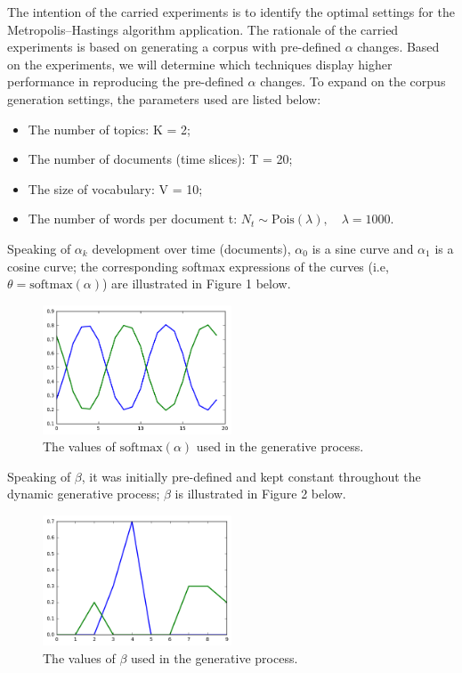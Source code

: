 \documentclass[12pt]{article}
\begin{document}
\par The intention of the carried experiments is to identify the optimal settings for the Metropolis--Hastings algorithm application. 
The rationale of the carried experiments is based on generating a corpus with pre-defined $\alpha$ changes. Based on the experiments, we will determine which techniques display higher performance in reproducing the pre-defined $\alpha$ changes. To expand on the corpus generation settings, the parameters used are listed below:
\begin{itemize}
  \item The number of topics: K = 2;
  \item The number of documents (time slices): T = 20;
  \item The size of vocabulary: V = 10;
  \item The number of words per document t: $N_t \sim \mbox{Pois}(\lambda),\quad \lambda = 1000$.
\end{itemize}
Speaking of $\alpha_k$ development over time (documents), $\alpha_0$ is a sine curve and $\alpha_1$ is a cosine curve; the corresponding softmax expressions of the curves (i.e, $\theta = \mbox{softmax}(\alpha)$) are illustrated in Figure 1 below.
\begin{figure}[H]
  \centering
  \includegraphics[width=0.5\textwidth]{alpha_initial}
  \caption{The values of $\mbox{softmax}(\alpha)$ used in the generative process.}
  \label{fig:mu}
\end{figure}
Speaking of $\beta$, it was initially pre-defined and kept constant throughout the dynamic generative process; $\beta$ is illustrated in Figure 2 below.
\begin{figure}[H]
  \centering
  \includegraphics[width=0.5\textwidth]{beta_initial}
  \caption{The values of $\beta$ used in the generative process.}
  \label{fig:beta}
\end{figure}
\end{document}
